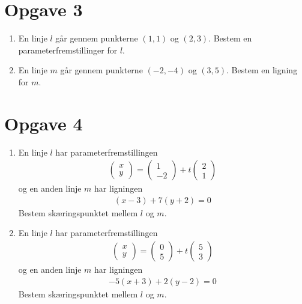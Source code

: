 \section*{Opgave 3}
\begin{enumerate}[label=\roman*)]
	\item En linje $l$ går gennem punkterne $(1,1)$ og $(2,3)$. Bestem en parameterfremstillinger for 
	$l$. 
	\item En linje $m$ går gennem punkterne $(-2,-4)$ og $(3,5)$. Bestem en ligning for $m$. 
\end{enumerate}

\section*{Opgave 4}
\begin{enumerate}[label=\roman*)]
	\item En linje $l$ har parameterfremstillingen 
	\begin{align*}
		\begin{pmatrix}
			x \\ y
		\end{pmatrix} = 
		\begin{pmatrix}
			1 \\ -2
		\end{pmatrix} + t
		\begin{pmatrix}
			2 \\ 1
		\end{pmatrix}
	\end{align*}
	og en anden linje $m$ har ligningen
	\begin{align*}
		(x-3) + 7(y+2) = 0
	\end{align*}
	Bestem skæringspunktet mellem $l$ og $m$. 
	\item En linje $l$ har parameterfremstillingen 
	\begin{align*}
		\begin{pmatrix}
			x \\ y
		\end{pmatrix} = 
		\begin{pmatrix}
			0 \\ 5
		\end{pmatrix} + t
		\begin{pmatrix}
			5 \\ 3
		\end{pmatrix}
	\end{align*}
	og en anden linje $m$ har ligningen
	\begin{align*}
		-5(x+3) + 2(y-2) = 0
	\end{align*}
	Bestem skæringspunktet mellem $l$ og $m$. 
\end{enumerate}

